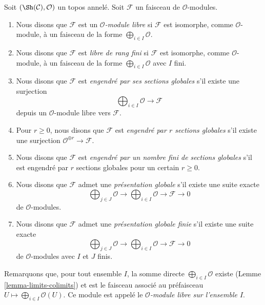 \begin{definition}
\label{definition-global}
Soit $(\Sh(\mathcal{C}), \mathcal{O})$ un topos annelé. Soit $\mathcal{F}$ un
faisceau de $\mathcal{O}$-modules.
\begin{enumerate}
\item Nous disons que $\mathcal{F}$ est un {\it $\mathcal{O}$-module libre}
si $\mathcal{F}$ est isomorphe, comme $\mathcal{O}$-module, à un faisceau de la
forme
$\bigoplus_{i \in I} \mathcal{O}$.
\item Nous disons que $\mathcal{F}$ est {\it libre de rang fini} si
$\mathcal{F}$ est isomorphe, comme $\mathcal{O}$-module, à un faisceau de la forme
$\bigoplus_{i \in I} \mathcal{O}$ avec $I$ fini.
\item Nous disons que $\mathcal{F}$ est {\it engendré par ses sections
globales} s'il existe une surjection
$$
\bigoplus\nolimits_{i \in I} \mathcal{O} \longrightarrow \mathcal{F}
$$
depuis un $\mathcal{O}$-module libre vers $\mathcal{F}$.
\item Pour $r \geq 0$, nous disons que $\mathcal{F}$ est {\it engendré par
$r$ sections globales} s'il existe une surjection
$\mathcal{O}^{\oplus r} \to \mathcal{F}$.
\item Nous disons que $\mathcal{F}$ est {\it engendré par un nombre fini de
sections globales} s'il est engendré par $r$ sections globales pour un certain
$r \geq 0$.
\item Nous disons que $\mathcal{F}$ admet une {\it présentation globale} s'il
existe une suite exacte
$$
\bigoplus\nolimits_{j \in J} \mathcal{O} \longrightarrow
\bigoplus\nolimits_{i \in I} \mathcal{O} \longrightarrow
\mathcal{F} \longrightarrow 0
$$
de $\mathcal{O}$-modules.
\item Nous disons que $\mathcal{F}$ admet une {\it présentation globale finie}
s'il existe une suite exacte
$$
\bigoplus\nolimits_{j \in J} \mathcal{O} \longrightarrow
\bigoplus\nolimits_{i \in I} \mathcal{O} \longrightarrow
\mathcal{F} \longrightarrow 0
$$
de $\mathcal{O}$-modules avec $I$ et $J$ finis.
\end{enumerate}
\end{definition}

\noindent
Remarquons que, pour tout ensemble $I$, la somme directe
$\bigoplus_{i \in I} \mathcal{O}$ existe (Lemme
\ref{lemma-limits-colimits}) et est le faisceau associé au préfaisceau
$U \mapsto \bigoplus_{i \in I} \mathcal{O}(U)$. Ce module est appelé le
{\it $\mathcal{O}$-module libre sur l'ensemble $I$}.

